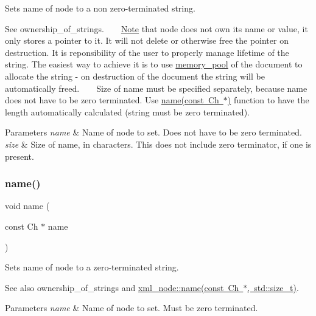 Sets name of node to a non zero-\/terminated string. 

See ownership\+\_\+of\+\_\+strings. ~\newline
~\newline
 \mbox{\hyperlink{classNote}{Note}} that node does not own its name or value, it only stores a pointer to it. It will not delete or otherwise free the pointer on destruction. It is reponsibility of the user to properly manage lifetime of the string. The easiest way to achieve it is to use \mbox{\hyperlink{classrapidxml_1_1memory__pool}{memory\+\_\+pool}} of the document to allocate the string -\/ on destruction of the document the string will be automatically freed. ~\newline
~\newline
 Size of name must be specified separately, because name does not have to be zero terminated. Use \mbox{\hyperlink{classrapidxml_1_1xml__base_ae099c291e104a0d277307fe71f5e0f9e}{name(const Ch $\ast$)}} function to have the length automatically calculated (string must be zero terminated). 
\begin{DoxyParams}{Parameters}
{\em name} & Name of node to set. Does not have to be zero terminated. \\
\hline
{\em size} & Size of name, in characters. This does not include zero terminator, if one is present. \\
\hline
\end{DoxyParams}
\mbox{\label{classrapidxml_1_1xml__base_ae099c291e104a0d277307fe71f5e0f9e}} 
\subsubsection{\texorpdfstring{name()}{name()}\hspace{0.1cm}{\footnotesize\ttfamily [3/3]}}
{\footnotesize\ttfamily void name (\begin{DoxyParamCaption}\item[{const Ch $\ast$}]{name }\end{DoxyParamCaption})\hspace{0.3cm}{\ttfamily [inline]}}



Sets name of node to a zero-\/terminated string. 

See also ownership\+\_\+of\+\_\+strings and \mbox{\hyperlink{classrapidxml_1_1xml__base_a4e7e23d06d48126c65b1f6266acfba5c}{xml\+\_\+node\+::name(const Ch $\ast$, std\+::size\+\_\+t)}}. 
\begin{DoxyParams}{Parameters}
{\em name} & Name of node to set. Must be zero terminated. \\
\hline
\end{DoxyParams}
\mbox{\label{classrapidxml_1_1xml__base_ad01e2eff02202b130baad012d1ed7328}} 
